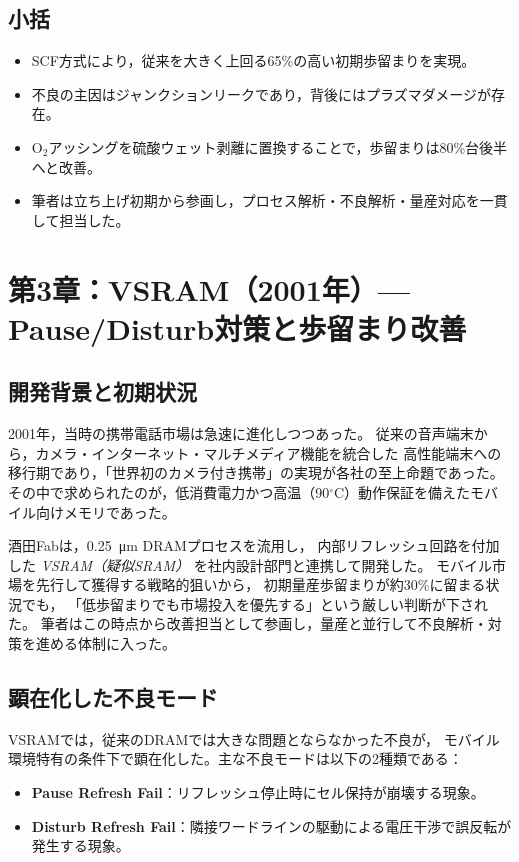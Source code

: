 \documentclass[conference]{IEEEtran}
\let\meter\metre
\begin{document}
\subsection{小括}
\begin{itemize}
  \item SCF方式により，従来を大きく上回る65\%の高い初期歩留まりを実現。
  \item 不良の主因はジャンクションリークであり，背後にはプラズマダメージが存在。
  \item O$_2$アッシングを硫酸ウェット剥離に置換することで，歩留まりは80\%台後半へと改善。
  \item 筆者は立ち上げ初期から参画し，プロセス解析・不良解析・量産対応を一貫して担当した。
\end{itemize}

\section{第3章：VSRAM（2001年）— Pause/Disturb対策と歩留まり改善}

\subsection{開発背景と初期状況}
2001年，当時の携帯電話市場は急速に進化しつつあった。
従来の音声端末から，カメラ・インターネット・マルチメディア機能を統合した
高性能端末への移行期であり，「世界初のカメラ付き携帯」の実現が各社の至上命題であった。  
その中で求められたのが，低消費電力かつ高温（90$^\circ$C）動作保証を備えたモバイル向けメモリであった。

酒田Fabは，\SI{0.25}{\micro\meter} DRAMプロセスを流用し，
内部リフレッシュ回路を付加した \emph{VSRAM（疑似SRAM）} を社内設計部門と連携して開発した。
モバイル市場を先行して獲得する戦略的狙いから，
初期量産歩留まりが約30\%に留まる状況でも，
「低歩留まりでも市場投入を優先する」という厳しい判断が下された。  
筆者はこの時点から改善担当として参画し，量産と並行して不良解析・対策を進める体制に入った。

\subsection{顕在化した不良モード}
VSRAMでは，従来のDRAMでは大きな問題とならなかった不良が，
モバイル環境特有の条件下で顕在化した。主な不良モードは以下の2種類である：
\begin{itemize}
  \item \textbf{Pause Refresh Fail}：リフレッシュ停止時にセル保持が崩壊する現象。
  \item \textbf{Disturb Refresh Fail}：隣接ワードラインの駆動による電圧干渉で誤反転が発生する現象。
\end{itemize}
\end{document}
